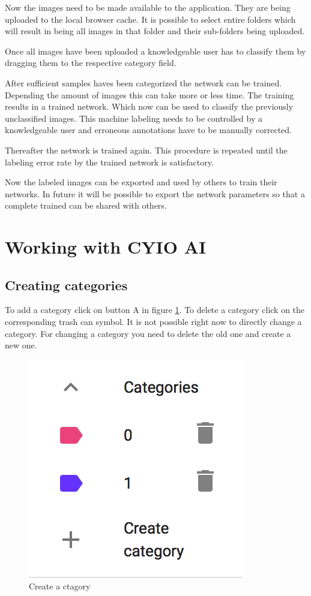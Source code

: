 Now the images need to be made available to the application.
They are being uploaded to the local browser cache.
It is possible to select entire folders which will result in being all images in that folder and their sub-folders being uploaded.

Once all images have been uploaded a knowledgeable user has
to classify them by dragging them to the respective category field.

After sufficient samples haves been categorized the network
can be trained. Depending the amount of images this can take more or less time. The training results in a trained network.
Which now can be used to classify the previously
unclassified images. This machine labeling needs to
be controlled by a knowledgeable user
and erroneous annotations have to be manually corrected.

Thereafter the network is trained again. This procedure is 
repeated until the labeling error rate by the trained
network is satisfactory.

Now the labeled images can be exported and used by others
to train their networks. In future it will be possible to
export the network parameters so that a complete trained
can be shared with others.


\section{Working with CYIO AI}

\subsection{Creating categories}
To add a category click on button A in figure \ref{fig:Category}. To delete a category click on the corresponding trash can symbol. 
It is not possible right now to directly change a category.
For changing a category you need to delete the old one and
create a new one.

\begin{figure}[H]
	\centering
	\includegraphics[scale=0.8]{bilder/cyto/categories.png}
	\caption{Create a ctagory}
	\label{fig:Category}
\end{figure}

